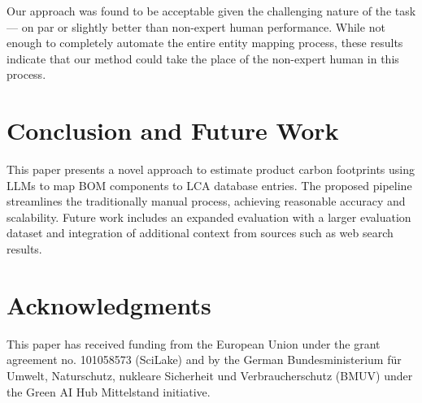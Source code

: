 \documentclass[11pt]{article}
\begin{document}
Our approach was found to be acceptable given the challenging nature of the task --- on par or slightly better than non-expert human performance. While not enough to completely automate the entire entity mapping process, these results indicate that our method could take the place of the non-expert human in this process.

\section{Conclusion and Future Work}

This paper presents a novel approach to estimate product carbon footprints using LLMs to map BOM components to LCA database entries. The proposed pipeline streamlines the traditionally manual process, achieving reasonable accuracy and scalability. Future work includes an expanded evaluation with a larger evaluation dataset and integration of additional context from sources such as web search results.
\section*{Acknowledgments}

This paper has received funding from the European Union under the grant agreement no. 101058573 (SciLake) and by the German  Bundesministerium für Umwelt, Naturschutz, nukleare Sicherheit und Verbraucherschutz (BMUV) under the Green AI Hub Mittelstand initiative.



\end{document}
